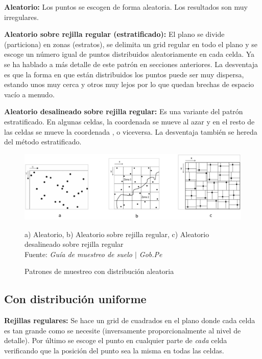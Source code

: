 \documentclass{report}
\begin{document}
\textbf{Aleatorio:} Los puntos se escogen de forma aleatoria. Los resultados son muy irregulares.

\bigbreak

\textbf{Aleatorio sobre rejilla regular (estratificado):} El plano se divide (particiona) en zonas (estratos), se delimita un grid regular en todo el plano y se escoge un número igual de puntos distribuidos aleatoriamente en cada celda. Ya se ha hablado a más detalle de este patrón en secciones anteriores. La desventaja es que la forma en que están distribuidos los puntos puede ser muy dispersa, estando unos muy cerca y otros muy lejos por lo que quedan brechas de espacio vacío a menudo.

\bigbreak

\textbf{Aleatorio desalineado sobre rejilla regular:} Es una variante del patrón estratificado. En algunas celdas, la coordenada  se mueve al azar y en el resto de las celdas se mueve la coordenada , o viceversa. La desventaja también se hereda del método estratificado.

\begin{figure}[H]
    \centering
    \includegraphics[width=0.7\paperwidth]{ref/random-sampling-patterns.png}
    \caption{Patrones de muestreo con distribución aleatoria}
    a) Aleatorio, b) Aleatorio sobre rejilla regular, c) Aleatorio desalineado sobre rejilla regular \\
    Fuente: \textit{Guía de muestreo de suelo $\mid$ Gob.Pe} \cite{gobpe-ministerio-del-ambiente-2014}
\end{figure}

\subsection{Con distribución uniforme}

\textbf{Rejillas regulares:} Se hace un grid de cuadrados en el plano donde cada celda es tan grande como se necesite (inversamente proporcionalmente al nivel de detalle). Por último se escoge el punto en cualquier parte de \textit{cada} celda verificando que la posición del punto sea la misma en todas las celdas.
\end{document}
